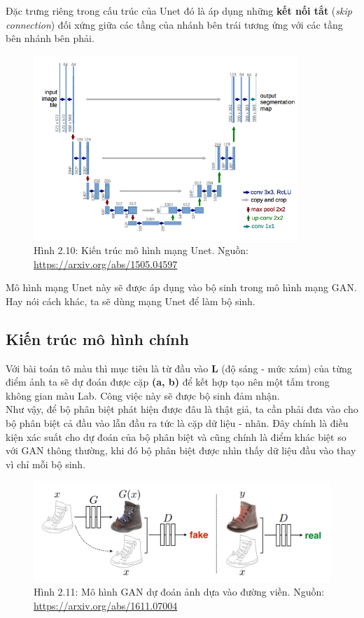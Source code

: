\documentclass[a4paper]{article}
\begin{document}
\noindent
Đặc trưng riêng trong cấu trúc của Unet đó là áp dụng những \textbf{kết nối tắt} (\textit{skip connection}) đối xứng giữa các tầng của nhánh bên trái tương ứng với các tầng bên nhánh bên phải.
\begin{figure}[h!]
\centering
\includegraphics[width=10cm]{images/2_8.png}
\caption{Hình 2.10: Kiến trúc mô hình mạng Unet. Nguồn: \href{https://arxiv.org/abs/1505.04597}{https://arxiv.org/abs/1505.04597}}
\end{figure}

\noindent
Mô hình mạng Unet này sẽ được áp dụng vào bộ sinh trong mô hình mạng GAN. Hay nói cách khác, ta sẽ dùng mạng Unet để làm bộ sinh.

\subsection{Kiến trúc mô hình chính}
Với bài toán tô màu thì mục tiêu là từ đầu vào \textbf{L} (độ sáng - mức xám) của từng điểm ảnh ta sẽ dự đoán được cặp \textbf{(a, b)} để kết hợp tạo nên một tấm trong không gian màu Lab. Công việc này sẽ được bộ sinh đảm nhận.\\
Như vậy, để bộ phân biệt phát hiện được đâu là thật giả, ta cần phải đưa vào cho bộ phân biệt cả đầu vào lẫn đầu ra tức là cặp dữ liệu - nhãn. Đây chính là điều kiện xác suất cho dự đoán của bộ phân biệt và cũng chính là điểm khác biệt so với GAN thông thường, khi đó bộ phân biệt được nhìn thấy dữ liệu đầu vào thay vì chỉ mỗi bộ sinh.

\begin{figure}[h!]
\centering
\includegraphics[width=13cm]{images/2_9.PNG}
\caption{Hình 2.11: Mô hình GAN dự đoán ảnh dựa vào đường viền. Nguồn: \href{https://arxiv.org/abs/1611.07004}{https://arxiv.org/abs/1611.07004}}
\end{figure}
\end{document}
